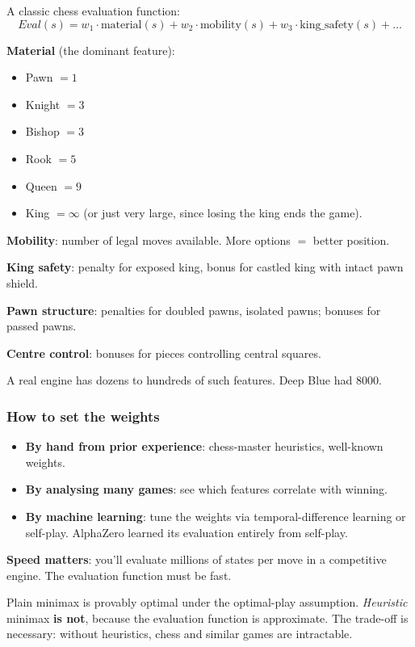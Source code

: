 \documentclass[11pt, a4paper]{article}
\begin{document}
A classic chess evaluation function:
\[
\mathit{Eval}(s) = w_1 \cdot \text{material}(s) + w_2 \cdot \text{mobility}(s) + w_3 \cdot \text{king\_safety}(s) + \dots
\]

\textbf{Material} (the dominant feature):
\begin{itemize}[itemsep=0pt, topsep=0pt]
  \item Pawn $= 1$
  \item Knight $= 3$
  \item Bishop $= 3$
  \item Rook $= 5$
  \item Queen $= 9$
  \item King $= \infty$ (or just very large, since losing the king ends the game).
\end{itemize}

\textbf{Mobility}: number of legal moves available. More options $=$ better position.

\textbf{King safety}: penalty for exposed king, bonus for castled king with intact pawn shield.

\textbf{Pawn structure}: penalties for doubled pawns, isolated pawns; bonuses for passed pawns.

\textbf{Centre control}: bonuses for pieces controlling central squares.

A real engine has dozens to hundreds of such features. Deep Blue had 8000.

\subsubsection*{How to set the weights}

\begin{itemize}
  \item \textbf{By hand from prior experience}: chess-master heuristics, well-known weights.
  \item \textbf{By analysing many games}: see which features correlate with winning.
  \item \textbf{By machine learning}: tune the weights via temporal-difference learning or self-play. AlphaZero learned its evaluation entirely from self-play.
\end{itemize}

\textbf{Speed matters}: you'll evaluate millions of states per move in a competitive engine. The evaluation function must be fast.

\begin{pitfallbox}
Plain minimax is provably optimal under the optimal-play assumption. \emph{Heuristic} minimax \textbf{is not}, because the evaluation function is approximate. The trade-off is necessary: without heuristics, chess and similar games are intractable.
\end{pitfallbox}
\end{document}
